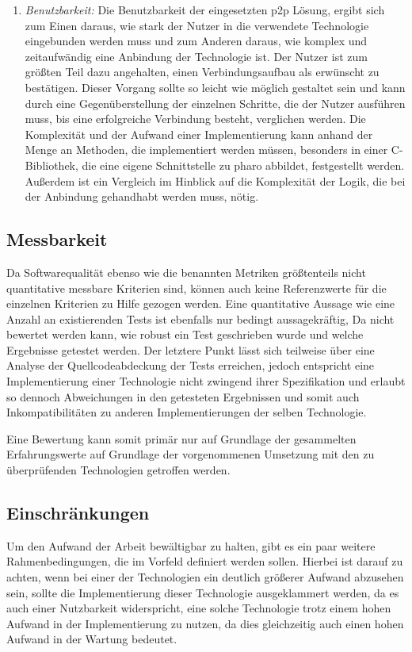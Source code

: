 \begin{enumerate}
    	\item {\it Benutzbarkeit:}
    	Die Benutzbarkeit der eingesetzten p2p Lösung, ergibt sich zum Einen daraus, wie stark der Nutzer in die verwendete Technologie eingebunden werden muss und zum Anderen daraus, wie komplex und zeitaufwändig eine Anbindung der Technologie ist.
    	Der Nutzer ist zum größten Teil dazu angehalten, einen Verbindungsaufbau als erwünscht zu bestätigen. Dieser Vorgang sollte so leicht wie möglich gestaltet sein und kann durch eine Gegenüberstellung der einzelnen Schritte, die der Nutzer ausführen muss, bis eine erfolgreiche Verbindung besteht, verglichen werden.
    	Die Komplexität und der Aufwand einer Implementierung kann anhand der Menge an Methoden, die implementiert werden müssen, besonders in einer C-Bibliothek, die eine eigene Schnittstelle zu pharo abbildet, festgestellt werden. Außerdem ist ein Vergleich im Hinblick auf die Komplexität der Logik, die bei der Anbindung gehandhabt werden muss, nötig.
    	\end{enumerate}
    		\subsection{Messbarkeit}
		Da Softwarequalität ebenso wie die benannten Metriken größtenteils nicht quantitative messbare Kriterien sind, können auch keine Referenzwerte für die einzelnen Kriterien zu Hilfe gezogen werden. Eine quantitative Aussage wie eine Anzahl an existierenden Tests ist ebenfalls nur bedingt aussagekräftig, Da nicht bewertet werden kann, wie robust ein Test geschrieben wurde und welche Ergebnisse getestet werden. Der letztere Punkt lässt sich teilweise über eine Analyse der Quellcodeabdeckung der Tests erreichen, jedoch entspricht eine Implementierung einer Technologie nicht zwingend ihrer Spezifikation und erlaubt so dennoch Abweichungen in den getesteten Ergebnissen und somit auch Inkompatibilitäten zu anderen Implementierungen der selben Technologie.
		
		Eine Bewertung kann somit primär nur auf Grundlage der gesammelten Erfahrungswerte auf Grundlage der vorgenommenen Umsetzung mit den zu überprüfenden Technologien getroffen werden. 
		
		\subsection{Einschränkungen}
		Um den Aufwand der Arbeit bewältigbar zu halten, gibt es ein paar weitere Rahmenbedingungen, die im Vorfeld definiert werden sollen. Hierbei ist darauf zu achten, wenn bei einer der Technologien ein deutlich größerer Aufwand abzusehen sein, sollte die Implementierung dieser Technologie ausgeklammert werden, da es auch einer Nutzbarkeit widerspricht, eine solche Technologie trotz einem hohen Aufwand in der Implementierung zu nutzen, da dies gleichzeitig auch einen hohen Aufwand in der Wartung bedeutet.
		
